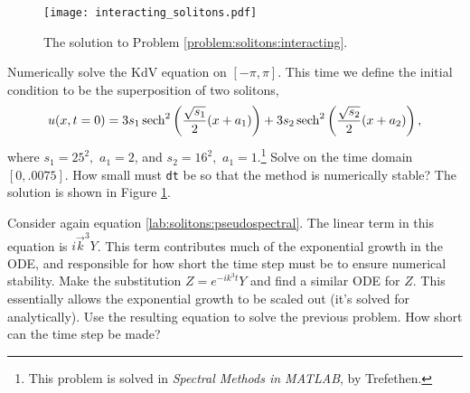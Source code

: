 \begin{figure}
\centering
\texttt{[image: interacting\_solitons.pdf]}
\caption{The solution to Problem \ref{problem:solitons:interacting}.}
\label{fig:solitons:interacting}
\end{figure}


\begin{problem}
Numerically solve the KdV equation on $[-\pi,\pi]$. This time we define the initial condition 
to be the superposition of two solitons,
\[
u(x,t=0) = 3s_1\operatorname{sech}^2\left(\frac{\sqrt{s_1}}{2}(x+a_1)\right) + 3s_2\operatorname{sech}^2\left(\frac{\sqrt{s_2}}{2}(x+a_2)\right),
\]
where $s_1 = 25^2,$ $a_1 = 2$, and $s_2 = 16^2,$ $a_1 = 1$.\footnote{This problem is solved in \textit{Spectral Methods in MATLAB}, by Trefethen.} Solve on the time domain $[0,.0075]$.  How small must {\tt dt} be so that the method is numerically stable?  The solution is shown in Figure \ref{fig:solitons:interacting}.
\label{problem:solitons:interacting}
\end{problem}







\begin{problem}
	Consider again equation \eqref{lab:solitons:pseudospectral}. The linear term in this equation is 
	$i\vec{k}^3Y$. This term contributes much of the exponential growth in the ODE, and responsible for 
	how short the time step must be to ensure numerical stability. Make the substitution $Z = e^{-ik^3t}Y$ and find a similar ODE for $Z$. This essentially allows the exponential growth to be scaled out (it's solved for analytically). Use the resulting equation to solve the previous problem. How short can the time step be made? 
\end{problem}











